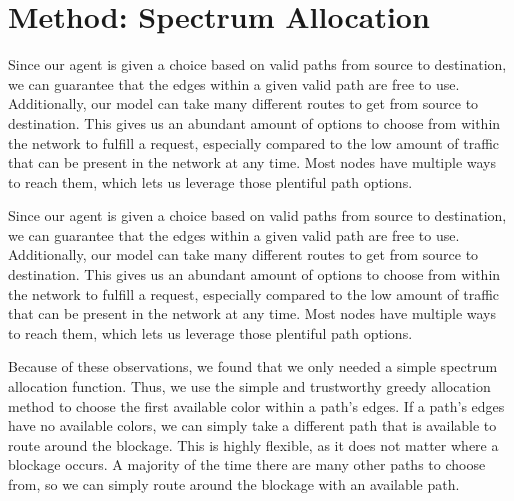 \documentclass[conference]{IEEEtran}
\begin{document}
\section{Method: Spectrum Allocation}
\begin{flushleft}
Since our agent is given a choice based on valid paths from source to destination, we can guarantee that the edges within a given valid path are free to use. Additionally, our model can take many different routes to get from source to destination. This gives us an abundant amount of options to choose from within the network to fulfill a request, especially compared to the low amount of traffic that can be present in the network at any time. Most nodes have multiple ways to reach them, which lets us leverage those plentiful path options. 
\end{flushleft}
\begin{flushleft}
Since our agent is given a choice based on valid paths from source to destination, we can guarantee that the edges within a given valid path are free to use. Additionally, our model can take many different routes to get from source to destination. This gives us an abundant amount of options to choose from within the network to fulfill a request, especially compared to the low amount of traffic that can be present in the network at any time. Most nodes have multiple ways to reach them, which lets us leverage those plentiful path options. 
\end{flushleft}
\begin{flushleft}
Because of these observations, we found that we only needed a simple spectrum allocation function. Thus, we use the simple and trustworthy greedy allocation method to choose the first available color within a path's edges. If a path's edges have no available colors, we can simply take a different path that is available to route around the blockage. This is highly flexible, as it does not matter where a blockage occurs. A majority of the time there are many other paths to choose from, so we can simply route around the blockage with an available path.
\end{flushleft}
\end{document}
